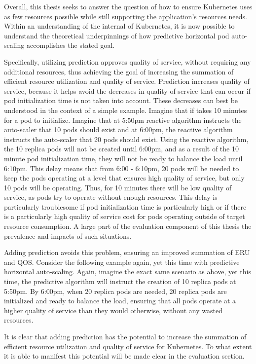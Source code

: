 Overall, this thesis seeks to answer the question of how to ensure Kubernetes
uses as few resources possible while still supporting the application's
resources needs. Within an understanding of the internal of Kubernetes, it is now
possible to understand the theoretical underpinnings of how predictive
horizontal pod auto-scaling accomplishes the stated goal.

Specifically, utilizing prediction approves quality of service, without
requiring any additional resources, thus achieving the goal of increasing the
summation of efficient resource utilization and quality of service. Prediction
increases quality of service, because it helps avoid the decreases in quality of
service that can occur if pod initialization time is not taken into account.
These decreases can best be understood in the context of a simple example.
Imagine that if takes 10 minutes for a pod to initialize. Imagine that at 5:50pm
reactive algorithm instructs the auto-scaler that 10 pods should exist and at
6:00pm, the reactive algorithm instructs the auto-scaler that 20 pods should
exist. Using the reactive algorithm, the 10 replica pods will not be created
until 6:00pm, and as a result of the 10 minute pod initialization time, they
will not be ready to balance the load until 6:10pm. This delay means that from
6:00 - 6:10pm, 20 pods will be needed to keep the pods operating at a level that
ensures high quality of service, but only 10 pods will be operating. Thus, for
10 minutes there will be low quality of service, as pods try to operate without
enough resources. This delay is particularly troublesome if pod initialization
time is particularly high or if there is a particularly high quality of service
cost for pods operating outside of target resource consumption. A large part of
the evaluation component of this thesis the prevalence and impacts of such
situations.

Adding prediction avoids this problem, ensuring an improved summation of ERU and
QOS. Consider the following example again, yet this time with predictive
horizontal auto-scaling. Again, imagine the exact same scenario as above, yet
this time, the predictive algorithm will instruct the creation of 10 replica
pods at 5:50pm. By 6:00pm, when 20 replica pods are needed, 20 replica pods are
initialized and ready to balance the load, ensuring that all pods operate at a
higher quality of service than they would otherwise, without any wasted
resources.

It is clear that adding prediction has the potential to increase the summation
of efficient resource utilization and quality of service for Kubernetes. To what
extent it is able to manifest this potential will be made clear in the
evaluation section.
